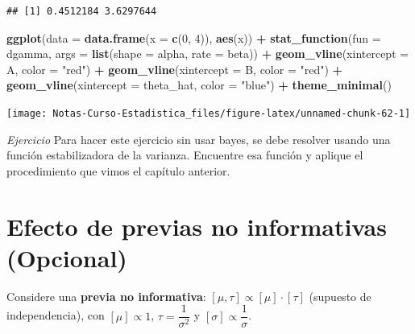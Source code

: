 \documentclass[
  12pt,
]{book}
\newenvironment{Shaded}{\begin{snugshade}}{\end{snugshade}}
\newcommand{\DataTypeTok}[1]{\textcolor[rgb]{0.13,0.29,0.53}{#1}}
\newcommand{\DecValTok}[1]{\textcolor[rgb]{0.00,0.00,0.81}{#1}}
\newcommand{\KeywordTok}[1]{\textcolor[rgb]{0.13,0.29,0.53}{\textbf{#1}}}
\newcommand{\NormalTok}[1]{#1}
\newcommand{\OperatorTok}[1]{\textcolor[rgb]{0.81,0.36,0.00}{\textbf{#1}}}
\newcommand{\StringTok}[1]{\textcolor[rgb]{0.31,0.60,0.02}{#1}}
\begin{document}
\begin{verbatim}
## [1] 0.4512184 3.6297644
\end{verbatim}

\begin{Shaded}
\begin{Highlighting}[]
\KeywordTok{ggplot}\NormalTok{(}\DataTypeTok{data =} \KeywordTok{data.frame}\NormalTok{(}\DataTypeTok{x =} \KeywordTok{c}\NormalTok{(}\DecValTok{0}\NormalTok{, }\DecValTok{4}\NormalTok{)), }\KeywordTok{aes}\NormalTok{(x)) }\OperatorTok{+}\StringTok{ }\KeywordTok{stat\_function}\NormalTok{(}\DataTypeTok{fun =}\NormalTok{ dgamma, }
    \DataTypeTok{args =} \KeywordTok{list}\NormalTok{(}\DataTypeTok{shape =}\NormalTok{ alpha, }\DataTypeTok{rate =}\NormalTok{ beta)) }\OperatorTok{+}\StringTok{ }\KeywordTok{geom\_vline}\NormalTok{(}\DataTypeTok{xintercept =}\NormalTok{ A, }
    \DataTypeTok{color =} \StringTok{"red"}\NormalTok{) }\OperatorTok{+}\StringTok{ }\KeywordTok{geom\_vline}\NormalTok{(}\DataTypeTok{xintercept =}\NormalTok{ B, }\DataTypeTok{color =} \StringTok{"red"}\NormalTok{) }\OperatorTok{+}\StringTok{ }
\StringTok{    }\KeywordTok{geom\_vline}\NormalTok{(}\DataTypeTok{xintercept =}\NormalTok{ theta\_hat, }\DataTypeTok{color =} \StringTok{"blue"}\NormalTok{) }\OperatorTok{+}\StringTok{ }
\StringTok{    }\KeywordTok{theme\_minimal}\NormalTok{()}
\end{Highlighting}
\end{Shaded}

\begin{center}\texttt{[image: Notas-Curso-Estadistica\_files/figure-latex/unnamed-chunk-62-1]} \end{center}

\emph{Ejercicio} Para hacer este ejercicio sin usar bayes, se debe resolver usando
una función estabilizadora de la varianza. Encuentre esa función y aplique el
procedimiento que vimos el capítulo anterior.

\hypertarget{efecto-de-previas-no-informativas-opcional}{%
\section{Efecto de previas no informativas (Opcional)}\label{efecto-de-previas-no-informativas-opcional}}

Considere una \textbf{previa no informativa}: \([\mu,\tau] \propto [\mu]\cdot[\tau]\) (supuesto de
independencia), con \([\mu] \propto 1\), \(\tau = \dfrac1{\sigma^2}\) y \([\sigma] \propto \dfrac{1}{\sigma}\).
\end{document}
